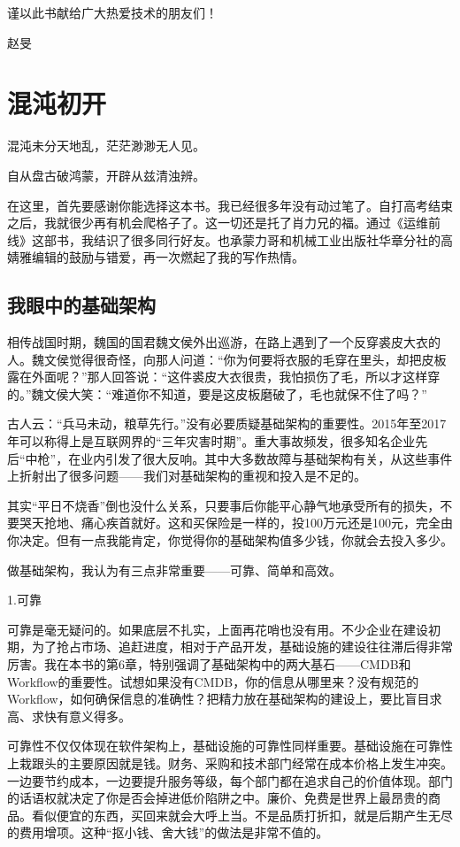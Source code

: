 \documentclass[12pt,UTF8]{ctexbook}
\begin{document}
谨以此书献给广大热爱技术的朋友们！

赵旻

\mainmatter

\chapter{混沌初开}

混沌未分天地乱，茫茫渺渺无人见。

自从盘古破鸿蒙，开辟从兹清浊辨。

在这里，首先要感谢你能选择这本书。我已经很多年没有动过笔了。自打高考结束之后，我就很少再有机会爬格子了。这一切还是托了肖力兄的福。通过《运维前线》这部书，我结识了很多同行好友。也承蒙力哥和机械工业出版社华章分社的高婧雅编辑的鼓励与错爱，再一次燃起了我的写作热情。

\section{我眼中的基础架构}

相传战国时期，魏国的国君魏文侯外出巡游，在路上遇到了一个反穿裘皮大衣的人。魏文侯觉得很奇怪，向那人问道：“你为何要将衣服的毛穿在里头，却把皮板露在外面呢？”那人回答说：“这件裘皮大衣很贵，我怕损伤了毛，所以才这样穿的。”魏文侯大笑：“难道你不知道，要是这皮板磨破了，毛也就保不住了吗？”

古人云：“兵马未动，粮草先行。”没有必要质疑基础架构的重要性。2015年至2017年可以称得上是互联网界的“三年灾害时期”。重大事故频发，很多知名企业先后“中枪”，在业内引发了很大反响。其中大多数故障与基础架构有关，从这些事件上折射出了很多问题——我们对基础架构的重视和投入是不足的。

其实“平日不烧香”倒也没什么关系，只要事后你能平心静气地承受所有的损失，不要哭天抢地、痛心疾首就好。这和买保险是一样的，投100万元还是100元，完全由你决定。但有一点我能肯定，你觉得你的基础架构值多少钱，你就会去投入多少。

做基础架构，我认为有三点非常重要——可靠、简单和高效。

1.可靠

可靠是毫无疑问的。如果底层不扎实，上面再花哨也没有用。不少企业在建设初期，为了抢占市场、追赶进度，相对于产品开发，基础设施的建设往往滞后得非常厉害。我在本书的第6章，特别强调了基础架构中的两大基石——CMDB和Workflow的重要性。试想如果没有CMDB，你的信息从哪里来？没有规范的Workflow，如何确保信息的准确性？把精力放在基础架构的建设上，要比盲目求高、求快有意义得多。

可靠性不仅仅体现在软件架构上，基础设施的可靠性同样重要。基础设施在可靠性上栽跟头的主要原因就是钱。财务、采购和技术部门经常在成本价格上发生冲突。一边要节约成本，一边要提升服务等级，每个部门都在追求自己的价值体现。部门的话语权就决定了你是否会掉进低价陷阱之中。廉价、免费是世界上最昂贵的商品。看似便宜的东西，买回来就会大呼上当。不是品质打折扣，就是后期产生无尽的费用增项。这种“抠小钱、舍大钱”的做法是非常不值的。
\end{document}
